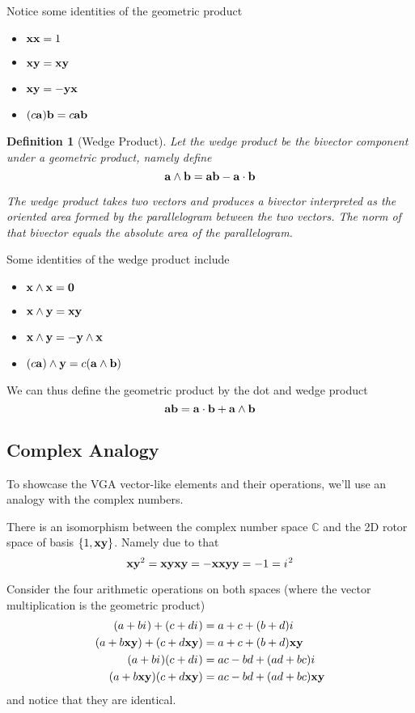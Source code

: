 \documentclass{article}
\newtheorem{defi}{Definition}[section]
\newcommand{\I}{{i\mkern1mu}}
\begin{document}
Notice some identities of the geometric product
\begin{itemize}
    \item $\vb x \vb x = 1$
    \item $\vb x \vb y = \vb {xy}$
    \item $\vb x \vb y = -\vb y \vb x$
    \item $(c \vb a) \vb b = c \vb a \vb b$
\end{itemize}


\begin{defi}[Wedge Product]
    Let the wedge product be the bivector component under a geometric product, namely define
    \[
        \vb a \land \vb b = \vb a \vb b - \vb a \cdot \vb b
    \]

    The wedge product takes two vectors and produces a bivector interpreted as the oriented area formed by the parallelogram between the two vectors. The norm of that bivector equals the absolute area of the parallelogram.
\end{defi}

Some identities of the wedge product include
\begin{itemize}
    \item $\vb x \land \vb x = \vb 0$
    \item $\vb x \land \vb y = \vb x \vb y$
    \item $\vb x \land \vb y = -\vb y \land \vb x$
    \item $(c \vb a) \land \vb y = c (\vb a \land \vb b)$
\end{itemize}

We can thus define the geometric product by the dot and wedge product
\[
    \vb {ab} = \vb a \cdot \vb b + \vb a \land \vb b
\]

\subsection{Complex Analogy}
To showcase the VGA vector-like elements and their operations, we'll use an analogy with the complex numbers.

There is an isomorphism between the complex number space $\mathbb{C}$ and the 2D rotor space of basis $\{1, \vb{xy}\}$. Namely due to that
\[
    \vb{xy}^2 = \vb{xyxy} = -\vb{xxyy} = -1 = \I^2
\]

Consider the four arithmetic operations on both spaces (where the vector multiplication is the geometric product)
\begin{align*}
    (a+b \I) + (c + d \I) &= a+c + (b+d) \I\\
    (a+b \vb{xy}) + (c + d\vb{xy}) &= a+c + (b+d) \vb{xy}\\
    (a+b\I)(c+d \I) &= ac - bd + (ad + bc) \I\\
    (a+b\vb{xy})(c+d\vb{xy}) &= ac - bd + (ad+bc) \vb{xy}
\end{align*}
and notice that they are identical.
\end{document}
